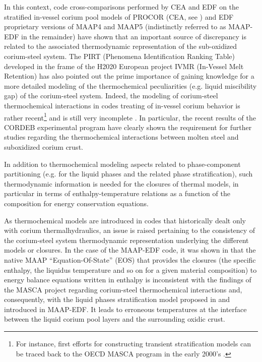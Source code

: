 \documentclass[11pt]{article}\usepackage{geometry} \geometry{letterpaper, margin=25.4mm}
\begin{document}
In this context, code cross-comparisons \cite{Bakouta2015} performed by CEA and EDF on the stratified in-vessel corium pool models of PROCOR (CEA, see \cite{LeTellier2015}) and EDF proprietary versions of MAAP4 \cite{maap4} and MAAP5 \cite{maap5} (indistinctly referred to as MAAP-EDF in the remainder) have shown that an important source of discrepancy is related to the associated thermodynamic representation of the sub-oxidized corium-steel system. The PIRT (Phenomena Identification Ranking Table) developed in the frame of the H2020 European project IVMR (In-Vessel Melt Retention) has also pointed out the prime importance of gaining knowledge for a more detailed modeling of the thermochemical peculiarities (e.g. liquid miscibility gap) of the corium-steel system. Indeed, the modeling of corium-steel thermochemical interactions in codes treating of in-vessel corium behavior is rather recent\footnote{For instance, first efforts for constructing transient stratification models can be traced back to the OECD MASCA program in the early 2000's \cite{Tsurikov2007}.} and is still very incomplete \cite{Carenini2018}. In particular, the recent results of the CORDEB experimental program \cite{Almyashev2018} have clearly shown the requirement for further studies regarding the thermochemical interactions between molten steel and suboxidized corium crust. 

In addition to thermochemical modeling aspects related to phase-component partitioning (e.g. for the liquid phases and the related phase stratification), such thermodynamic information is needed for the closures of thermal models, in particular in terms of enthalpy-temperature relations as a function of the composition for energy conservation equations.

As thermochemical models are introduced in codes that historically dealt only with corium thermalhydraulics, an issue is raised pertaining to the consistency of the corium-steel system thermodynamic representation underlying the different models or closures. In the case of the MAAP-EDF code, it was shown in \cite{Bakouta2015} that the native MAAP ``Equation-Of-State'' (EOS) that provides the closures (the specific enthalpy, the liquidus temperature and so on for a given material composition) to energy balance equations written in enthalpy is inconsistent with the findings of the MASCA project regarding corium-steel thermochemical interactions and, consequently, with the liquid phases stratification model proposed in \cite{LeTellier2014} and introduced in MAAP-EDF. It leads to erroneous temperatures at the interface between the liquid corium pool layers and the surrounding oxidic crust. 
\end{document}
